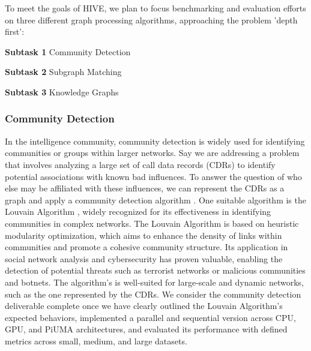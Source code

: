 \documentclass[letterpaper, 10pt]{article}
\begin{document}
\begin{multicols}{2}
{{        To meet the goals of HIVE, we plan to focus benchmarking and evaluation efforts on three different graph processing algorithms, approaching the problem 'depth first':
    \newline
    
        \textbf{Subtask 1} Community Detection
        
        \textbf{Subtask 2} Subgraph Matching
        
        \textbf{Subtask 3} Knowledge Graphs


        \subsubsection{Community Detection}\label{section:communityDetection}
            In the intelligence community, community detection is widely used for identifying communities or groups within larger networks. 
            Say we are addressing a problem that involves analyzing a large set of call data records (CDRs) to identify potential associations with known bad influences. 
            To answer the question of who else may be affiliated with these influences, we can represent the CDRs as a graph and apply a community detection algorithm \cite{Truicua2018}. 
            One suitable algorithm is the Louvain Algorithm \cite{Blondel2008}, widely recognized for its effectiveness in identifying communities in complex networks. 
            The Louvain Algorithm is based on heuristic modularity optimization, which aims to enhance the density of links within communities and promote a cohesive community structure. 
            Its application in social network analysis and cybersecurity has proven valuable, enabling the detection of potential threats such as terrorist networks or malicious communities and botnets. The algorithm's is well-suited for large-scale and dynamic networks, such as the one represented by the CDRs. We consider the community detection deliverable complete once we have clearly outlined the Louvain Algorithm's expected behaviors, implemented a parallel and sequential version across CPU, GPU, and PiUMA architectures, and evaluated its performance with defined metrics across small, medium, and large datasets. 
            
}}
\end{multicols}
\end{document}
